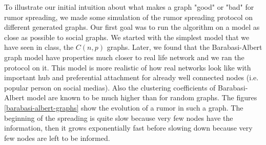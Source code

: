 \documentclass[10pt,journal,a4paper]{IEEEtran}
\begin{document}
To illustrate our initial intuition about what makes a graph "good" or "bad" for rumor spreading, we made some simulation of the rumor spreading protocol on different generated graphs. Our first goal was to run the algorithm on a model as close as possible to social graphs. We started with the simplest model that we have seen in class, the $C(n,p)$ graphs. Later, we found that the Barabasi-Albert graph model \cite{abmodel} have properties much closer to real life network and we ran the protocol on it. This model is more realistic of how real networks look like with important hub and preferential attachment for already well connected nodes (i.e. popular person on social medias). Also the clustering coefficients of Barabasi-Albert model are known to be much higher than for random graphs. The figures \ref{barabasi-albert-graphs} show the evolution of a rumor in such a graph. The beginning of the spreading is quite slow because very few nodes have the information, then it grows exponentially fast before slowing down because very few nodes are left to be informed. 
\end{document}
